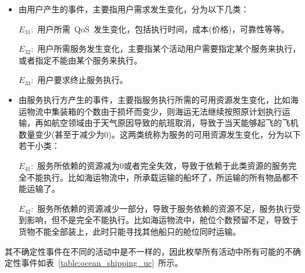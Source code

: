 \begin{itemize}
    
    \item 由用户产生的事件，主要指用户需求发生变化，分为以下几类：
    
    $E_{31}$:~用户所需~QoS~发生变化，包括执行时间，成本(价格)，可靠性等等。
    
    $E_{32}$:~用户所需服务发生变化，主要指某个活动用户需要指定某个服务来执行，或者指定不能由某个服务来执行。
    
    $E_{33}$:~用户要求终止服务执行。
    
    \item 由服务执行方产生的事件，主要指服务执行所需的可用资源发生变化，比如海运物流中集装箱的个数由于损坏而变少，则海运无法继续按照原计划执行运输，再如航空领域由于天气原因导致的航班取消，导致于当天能够起飞的飞机数量变少(甚至于减少为0)。这两类统称为服务的可用资源发生变化，分为以下若干小类：
    
    $E_{41}$:~服务所依赖的资源减为0或者完全失效，导致于依赖于此类资源的服务完全不能执行。比如海运物流中，所承载运输的船坏了，所运输的所有物品都不能运输了。
    
    $E_{42}$:~服务所依赖的资源减少一部分，导致于服务依赖的资源不足，服务执行受到影响，但不是完全不能执行。比如海运物流中，舱位个数预留不足，导致于货物不能全部装上，此时只能寻找其他船只的舱位同时运输。
    
    
\end{itemize}

其不确定性事件在不同的活动中是不一样的，因此枚举所有活动中所有可能的不确定性事件如表~\ref{table:ocean_shipping_uc}~所示。

